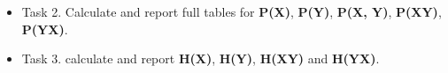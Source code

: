 \documentclass[11pt]{article}
\providecommand{\tightlist}{%
      \setlength{\itemsep}{0pt}\setlength{\parskip}{0pt}}
\begin{document}
    \begin{itemize}
\tightlist
\item
  Task 2. Calculate and report full tables for \textbf{P(X)},
  \textbf{P(Y)}, \textbf{P(X, Y)}, \textbf{P(X\textbar{}Y)},
  \textbf{P(Y\textbar{}X)}.
\end{itemize}

    \begin{itemize}
\tightlist
\item
  Task 3. calculate and report \textbf{H(X)}, \textbf{H(Y)},
  \textbf{H(X\textbar{}Y)} and \textbf{H(Y\textbar{}X)}.
\end{itemize}


    
    
    
    
\end{document}

